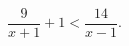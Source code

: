 \begin{ex}[type=inequality]
	\begin{condition}
		$\dfrac{9}{x + 1} + 1<\dfrac{14}{x - 1} .$
	\end{condition}
\end{ex}